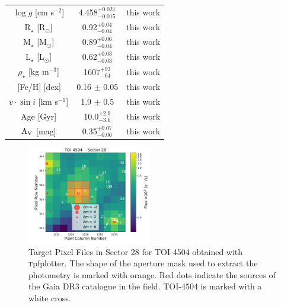\documentclass[twocolumn,twocolappendix]{aastex631}
\begin{document}
\begin{table}[ht!]
\begin{tabular}{ccc}
$\log g$ [cm s$^{-2}$]        & 4.458$^{+0.021}_{-0.015}$       & this work                         \\
R$_{\star}$ [R$_{\odot}$]            & 0.92$^{+0.04}_{-0.04}$           & this work                         \\
M$_{\star}$ [M$_{\odot}$]             & 0.89$^{+0.06}_{-0.04}$         & this work                         \\
L$_{\star}$ [L$_{\odot}$]             & 0.62$^{+0.03}_{-0.03}$       & this work                         \\
$\rho_{\star}$ [kg m$^{-3}$]          & 1607$^{+93}_{-64}$        & this work         \\ 
\,[Fe/H] [dex]         & 0.16 ${\pm}$ 0.05     & this work                         \\
$v \cdot \sin i$ [km s$^{-1}$]             & 1.9 ${\pm}$ 0.5     & this work                         \\
Age [Gyr]             & 10.0$^{+2.9}_{-3.6}$    & this work                         \\
$\rm{A_V}$ [mag]             & 0.35$^{+0.07}_{-0.06}$    & this work                         \\
\hline
\hline
\end{tabular}
 \end{table}


 
\begin{figure}[ht!]
  \centering
\includegraphics[width=0.48\textwidth]{TPF_Gaia_TIC349972412_S28.pdf}
  \caption{Target Pixel Files in Sector 28 for TOI-4504 obtained with {\textsc tpfplotter}. The shape of the aperture mask used to extract the photometry is marked with orange. Red dots indicate the sources of the Gaia DR3 catalogue in the field. TOI-4504 is marked with a white cross.}
  \label{TPF}
\end{figure}
\end{document}
